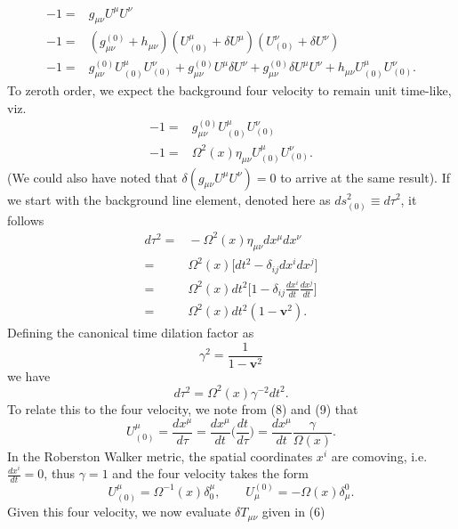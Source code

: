 \documentclass[10pt,letterpaper]{article}
\begin{document}
\begin{align}
	-1 =&{} g_{\mu\nu}U^\mu U^\nu\nonumber\\
-1=&{} (g_{\mu\nu}^{(0)} + h_{\mu\nu})(U_{(0)}^\mu+\delta U^\mu)(U_{(0)}^\nu +\delta U^\nu)\nonumber\\
-1 = &{} g_{\mu\nu}^{(0)} U^\mu_{(0)} U^\nu_{(0)} + g_{\mu\nu}^{(0)} U^\mu \delta U^\nu+ g_{\mu\nu}^{(0)} \delta U^\mu U^\nu
+ h_{\mu\nu} U^\mu_{(0)}U^\nu_{(0)}.
\end{align}
To zeroth order, we expect the background four velocity to remain unit time-like, viz.
\begin{align}
-1 =&{}  g_{\mu\nu}^{(0)} U^\mu_{(0)} U^\nu_{(0)}\nonumber \\
-1 =&{} \Omega^2(x) \eta_{\mu\nu}U^\mu_{(0)} U^\nu_{(0)}.
\end{align}
(We could also have noted that $\delta (g_{\mu\nu}U^\mu U^\nu) = 0$ to arrive at the same result). 
If we start with the background line element, denoted here as $ds_{(0)}^2 \equiv d\tau^2$, it follows
\begin{align}
	d\tau^2 =&{} - \Omega^2(x) \eta_{\mu\nu}dx^\mu dx^\nu\nonumber\\
= &{} \Omega^2(x) \big[ dt^2 - \delta_{ij} dx^i dx^j \big]\nonumber\\
= &{} \Omega^2(x) dt^2\bigg[1- \delta_{ij} \frac{dx^i}{dt} \frac{dx^j}{dt} \bigg]\nonumber\\
= &{} \Omega^2(x) dt^2(1-\mathbf{v}^2).
\end{align}
Defining the canonical time dilation factor as 
\begin{equation}
	\gamma^2 = \frac{1}{1-\mathbf v^2}
\end{equation}
we have
\begin{equation}
	d\tau^2 = \Omega^2 (x) \gamma^{-2} dt^2.
\end{equation}
To relate this to the four velocity, we note from (8) and (9) that
\begin{equation}
	U^{\mu}_{(0)} = \frac{dx^\mu}{d\tau} = \frac{dx^\mu}{dt}\bigg(\frac{dt}{d\tau}\bigg) = \frac{d x^\mu}{dt} \frac{\gamma}{\Omega(x)}.
\end{equation}
In the Roberston Walker metric, the spatial coordinates $x^i$ are comoving, i.e. $\frac{dx^i}{dt} = 0$, thus $\gamma = 1$ and the four velocity takes the form
\begin{equation}
	U_{(0)}^\mu = \Omega^{-1}(x) \delta^\mu_0,\qquad U_\mu^{(0)} = - \Omega(x) \delta_\mu^0.
\end{equation}
Given this four velocity, we now evaluate $\delta T_{\mu\nu}$ given in (6)
\end{document}
